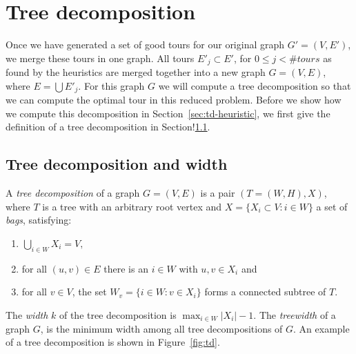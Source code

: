 \documentclass[12pt]{article}
\begin{document}
%
%
\section{Tree decomposition}
\label{sec:td}
Once we have generated a set of good tours for our original graph $G'=(V,E')$, we merge these
tours in one graph. All tours $E'_j \subset E'$, for $0 \leq j < \#tours$ as found by the
heuristics are merged together into a new graph $G = (V, E)$, where $E=\bigcup E'_j$. For this graph
$G$ we will compute a tree decomposition so that we can compute the optimal tour in this reduced
problem.
Before we show how we compute this decomposition in Section~\ref{sec:td-heuristic}, we first give
the definition of a tree decomposition in Section!\ref{sec:td-definition}.

    \subsection{Tree decomposition and width}
    \label{sec:td-definition}
    A \emph{tree decomposition} of a graph $G=(V, E)$ is a pair $(T=(W, H), X)$, where $T$ is a tree
    with an arbitrary root vertex and $X=\{X_i \subset V : i \in W\}$ a set of \emph{bags},
    satisfying:
    \begin{enumerate}
        \item $\bigcup_{i \in W} X_i = V,$
        \item for all $(u, v) \in E$ there is an $i \in W$ with $u, v \in X_i$ and
        \item for all $v \in V$, the set $W_v = \{i \in W: v \in X_i\}$ forms a connected subtree of $T$.
    \end{enumerate}
    The \emph{width} $k$ of the tree decomposition is $\max_{i \in W} |X_i| - 1$. The \emph{treewidth}
    of a graph $G$, is the minimum width among all tree decompositions of $G$.
    An example of a tree decomposition is shown in Figure~\ref{fig:td}.
\end{document}
